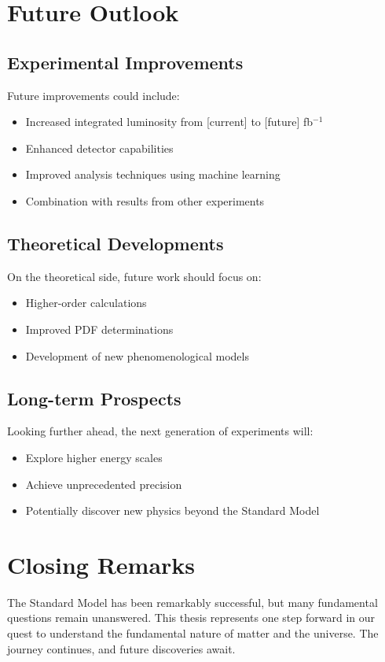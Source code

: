 \section{Future Outlook}

\subsection{Experimental Improvements}

Future improvements could include:
\begin{itemize}
  \item Increased integrated luminosity from [current] to [future] fb$^{-1}$
  \item Enhanced detector capabilities
  \item Improved analysis techniques using machine learning
  \item Combination with results from other experiments
\end{itemize}

\subsection{Theoretical Developments}

On the theoretical side, future work should focus on:
\begin{itemize}
  \item Higher-order calculations
  \item Improved PDF determinations
  \item Development of new phenomenological models
\end{itemize}

\subsection{Long-term Prospects}

Looking further ahead, the next generation of experiments will:
\begin{itemize}
  \item Explore higher energy scales
  \item Achieve unprecedented precision
  \item Potentially discover new physics beyond the Standard Model
\end{itemize}

\section{Closing Remarks}

The Standard Model has been remarkably successful, but many fundamental questions remain unanswered. This thesis represents one step forward in our quest to understand the fundamental nature of matter and the universe. The journey continues, and future discoveries await.
